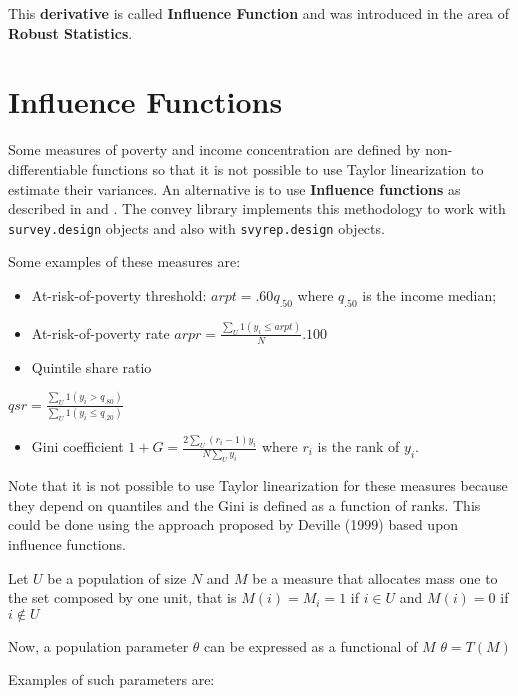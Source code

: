 \documentclass[]{book}
\providecommand{\tightlist}{%
  \setlength{\itemsep}{0pt}\setlength{\parskip}{0pt}}
\theoremstyle{definition}
\theoremstyle{definition}
\theoremstyle{remark}
\begin{document}
This \textbf{derivative} is called \textbf{Influence Function} and was
introduced in the area of \textbf{Robust Statistics}.

\section{Influence Functions}\label{influence-functions}

Some measures of poverty and income concentration are defined by
non-differentiable functions so that it is not possible to use Taylor
linearization to estimate their variances. An alternative is to use
\textbf{Influence functions} as described in \citep{deville1999} and
\citep{osier2009}. The convey library implements this methodology to
work with \texttt{survey.design} objects and also with
\texttt{svyrep.design} objects.

Some examples of these measures are:

\begin{itemize}
\item
  At-risk-of-poverty threshold: \(arpt=.60q_{.50}\) where \(q_{.50}\) is
  the income median;
\item
  At-risk-of-poverty rate \(arpr=\frac{\sum_U 1(y_i \leq arpt)}{N}.100\)
\item
  Quintile share ratio
\end{itemize}

\(qsr=\frac{\sum_U 1(y_i>q_{.80})}{\sum_U 1(y_i\leq q_{.20})}\)

\begin{itemize}
\tightlist
\item
  Gini coefficient \(1+G=\frac{2\sum_U (r_i-1)y_i}{N\sum_Uy_i}\) where
  \(r_i\) is the rank of \(y_i\).
\end{itemize}

Note that it is not possible to use Taylor linearization for these
measures because they depend on quantiles and the Gini is defined as a
function of ranks. This could be done using the approach proposed by
Deville (1999) based upon influence functions.

Let \(U\) be a population of size \(N\) and \(M\) be a measure that
allocates mass one to the set composed by one unit, that is
\(M(i)=M_i= 1\) if \(i\in U\) and \(M(i)=0\) if \(i\notin U\)

Now, a population parameter \(\theta\) can be expressed as a functional
of \(M\) \(\theta=T(M)\)

Examples of such parameters are:
\end{document}
